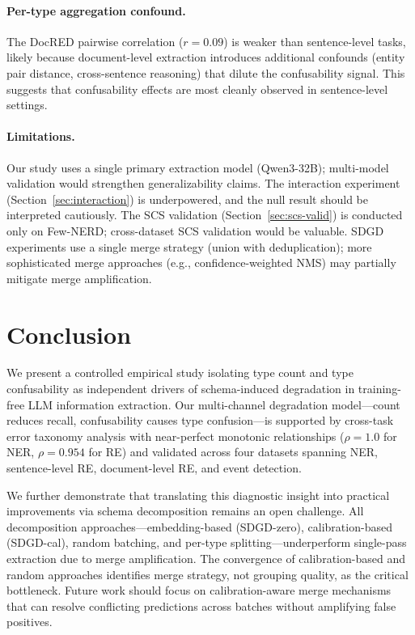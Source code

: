 \documentclass[11pt,a4paper]{article}
\begin{document}
\paragraph{Per-type aggregation confound.}
The DocRED pairwise correlation ($r{=}0.09$) is weaker than sentence-level tasks, likely because document-level extraction introduces additional confounds (entity pair distance, cross-sentence reasoning) that dilute the confusability signal. This suggests that confusability effects are most cleanly observed in sentence-level settings.

\paragraph{Limitations.}
Our study uses a single primary extraction model (Qwen3-32B); multi-model validation would strengthen generalizability claims. The interaction experiment (Section~\ref{sec:interaction}) is underpowered, and the null result should be interpreted cautiously. The SCS validation (Section~\ref{sec:scs-valid}) is conducted only on Few-NERD; cross-dataset SCS validation would be valuable. SDGD experiments use a single merge strategy (union with deduplication); more sophisticated merge approaches (e.g., confidence-weighted NMS) may partially mitigate merge amplification.

\section{Conclusion}

We present a controlled empirical study isolating type count and type confusability as independent drivers of schema-induced degradation in training-free LLM information extraction. Our multi-channel degradation model---count reduces recall, confusability causes type confusion---is supported by cross-task error taxonomy analysis with near-perfect monotonic relationships ($\rho{=}1.0$ for NER, $\rho{=}0.954$ for RE) and validated across four datasets spanning NER, sentence-level RE, document-level RE, and event detection.

We further demonstrate that translating this diagnostic insight into practical improvements via schema decomposition remains an open challenge. All decomposition approaches---embedding-based (SDGD-zero), calibration-based (SDGD-cal), random batching, and per-type splitting---underperform single-pass extraction due to merge amplification. The convergence of calibration-based and random approaches identifies merge strategy, not grouping quality, as the critical bottleneck. Future work should focus on calibration-aware merge mechanisms that can resolve conflicting predictions across batches without amplifying false positives.
\end{document}
